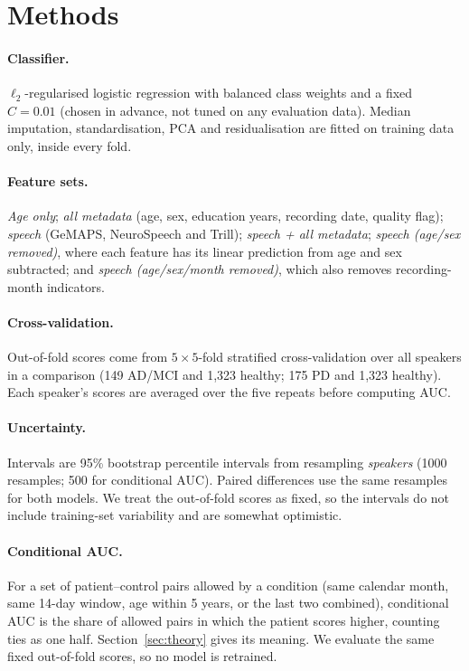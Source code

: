 \documentclass[10pt]{article}
\begin{document}
\section{Methods}\label{sec:methods}
\paragraph{Classifier.} $\ell_2$-regularised logistic regression with balanced class weights and a fixed $C=0.01$ (chosen in advance, not tuned on any evaluation data). Median imputation, standardisation, PCA and residualisation are fitted on training data only, inside every fold.

\paragraph{Feature sets.} \emph{Age only}; \emph{all metadata} (age, sex, education years, recording date, quality flag); \emph{speech} (GeMAPS, NeuroSpeech and Trill); \emph{speech + all metadata}; \emph{speech (age/sex removed)}, where each feature has its linear prediction from age and sex subtracted; and \emph{speech (age/sex/month removed)}, which also removes recording-month indicators.

\paragraph{Cross-validation.} Out-of-fold scores come from $5\times5$-fold stratified cross-validation over all speakers in a comparison (149 AD/MCI and 1,323 healthy; 175 PD and 1,323 healthy). Each speaker's scores are averaged over the five repeats before computing AUC.

\paragraph{Uncertainty.} Intervals are 95\% bootstrap percentile intervals from resampling \emph{speakers} (1000 resamples; 500 for conditional AUC). Paired differences use the same resamples for both models. We treat the out-of-fold scores as fixed, so the intervals do not include training-set variability and are somewhat optimistic.

\paragraph{Conditional AUC.} For a set of patient--control pairs allowed by a condition (same calendar month, same 14-day window, age within 5 years, or the last two combined), conditional AUC is the share of allowed pairs in which the patient scores higher, counting ties as one half. Section~\ref{sec:theory} gives its meaning. We evaluate the same fixed out-of-fold scores, so no model is retrained.
\end{document}
